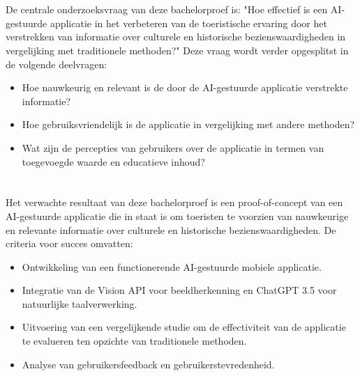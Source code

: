 \section{}%
\label{sec:onderzoeksvraag}

De centrale onderzoeksvraag van deze bachelorproef is: "Hoe effectief is een AI-gestuurde applicatie in het verbeteren van de toeristische ervaring door het verstrekken van informatie over culturele en historische bezienswaardigheden in vergelijking met traditionele methoden?" Deze vraag wordt verder opgesplitst in de volgende deelvragen:
\begin{itemize}
    \item Hoe nauwkeurig en relevant is de door de AI-gestuurde applicatie verstrekte informatie?
    \item Hoe gebruiksvriendelijk is de applicatie in vergelijking met andere methoden?
    \item Wat zijn de percepties van gebruikers over de applicatie in termen van toegevoegde waarde en educatieve inhoud?
\end{itemize}

\section{}%
\label{sec:onderzoeksdoelstelling}

Het verwachte resultaat van deze bachelorproef is een proof-of-concept van een AI-gestuurde applicatie die in staat is om toeristen te voorzien van nauwkeurige en relevante informatie over culturele en historische bezienswaardigheden. De criteria voor succes omvatten:
\begin{itemize}
    \item Ontwikkeling van een functionerende AI-gestuurde mobiele applicatie.
    \item Integratie van de Vision API voor beeldherkenning en ChatGPT 3.5 voor natuurlijke taalverwerking.
    \item Uitvoering van een vergelijkende studie om de effectiviteit van de applicatie te evalueren ten opzichte van traditionele methoden.
    \item Analyse van gebruikersfeedback en gebruikerstevredenheid.
\end{itemize}

\section{}%
\label{sec:opzet-bachelorproef}

